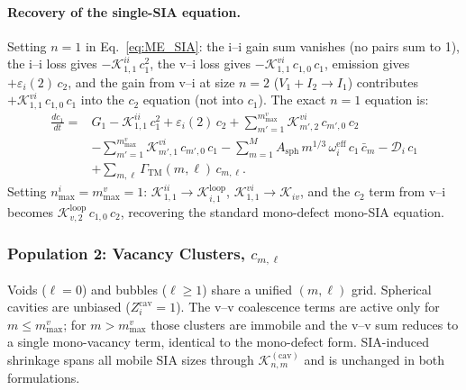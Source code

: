 \paragraph{Recovery of the single-SIA equation.}
Setting $n = 1$ in Eq.~\eqref{eq:ME_SIA}: the i--i gain sum vanishes
(no pairs sum to 1), the i--i loss gives $-\mathcal{K}_{1,1}^{ii}\,c_1^2$,
the v--i loss gives $-\mathcal{K}_{1,1}^{vi}\,c_{1,0}\,c_1$,
emission gives $+\varepsilon_i(2)\,c_2$, and the gain from v--i at size
$n=2$ ($V_1+I_2 \to I_1$) contributes $+\mathcal{K}_{1,1}^{vi}\,c_{1,0}\,c_1$
into the $c_2$ equation (not into $c_1$). The exact $n=1$ equation is:
\begin{equation}\label{eq:ME_I1}
\begin{split}
\frac{dc_1}{dt} = {} &
  G_1
  - \mathcal{K}_{1,1}^{ii}\,c_1^2
  + \varepsilon_i(2)\,c_2
  + \sum_{m'=1}^{m_{\max}^v}\mathcal{K}_{m',2}^{vi}\,c_{m',0}\,c_2
  \\
  &- \sum_{m'=1}^{m_{\max}^v}\mathcal{K}_{m',1}^{vi}\,c_{m',0}\,c_1
  - \sum_{m=1}^{M}
     A_{\mathrm{sph}}\,m^{1/3}\,\omega_i^{\mathrm{eff}}\,c_1\,\bar{c}_m
  - \mathcal{D}_i\,c_1
  \\
  &+ \sum_{m,\ell}\Gamma_{\mathrm{TM}}(m,\ell)\,c_{m,\ell}.
\end{split}
\end{equation}
Setting $n_{\max}^i = m_{\max}^v = 1$: $\mathcal{K}_{1,1}^{ii} \to
\mathcal{K}_{i,1}^{\mathrm{loop}}$, $\mathcal{K}_{1,1}^{vi} \to
\mathcal{K}_{iv}$, and the $c_2$ term from v--i becomes
$\mathcal{K}_{v,2}^{\mathrm{loop}}\,c_{1,0}\,c_2$, recovering the
standard mono-defect mono-SIA equation.


\subsubsection{Population 2: Vacancy Clusters, $c_{m,\ell}$}
\label{sec:ME_vac}

Voids ($\ell=0$) and bubbles ($\ell\geq 1$) share a unified $(m,\ell)$
grid. Spherical cavities are unbiased ($Z_i^{\mathrm{cav}} = 1$). The
v--v coalescence terms are active only for $m \leq m_{\max}^v$; for
$m > m_{\max}^v$ those clusters are immobile and the v--v sum reduces
to a single mono-vacancy term, identical to the mono-defect form.
SIA-induced shrinkage spans all mobile SIA sizes through
$\mathcal{K}_{n,m}^{(\mathrm{cav})}$ and is unchanged in both formulations.

